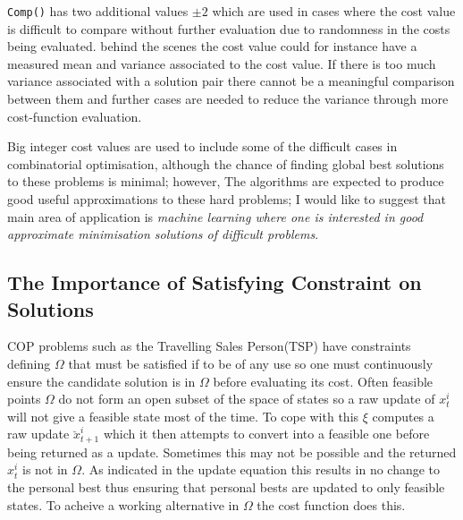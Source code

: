 \documentclass[a4paper,oneside,english]{book}
\numberwithin{equation}{section}
\numberwithin{figure}{section}
\begin{document}
\texttt{Comp()} has two additional values $\pm2$ which are used in cases where the cost value is difficult to compare without further evaluation due to randomness in the costs being evaluated. behind the scenes the cost value could for instance have a measured mean and variance associated to the cost value. If there is too much variance associated with a solution pair there cannot be a meaningful comparison between them and further cases are needed to reduce the variance through more cost-function evaluation.  

Big integer cost values are used to include some of the difficult cases in combinatorial optimisation, although the chance of finding global best solutions to these problems is minimal; however, The algorithms are expected to produce good useful approximations to these hard problems; I would like to suggest that main area of application is \emph{machine learning where one is interested in good approximate minimisation solutions of difficult problems}.


\subsection{The Importance of Satisfying Constraint on Solutions }
COP problems such as the Travelling Sales Person(TSP) have constraints defining $\varOmega$ that must be satisfied if to be of any use so one must continuously ensure the candidate solution is in $\varOmega$ before evaluating its cost. Often feasible points $\varOmega$ do not form an open subset of the space of states so a raw update of $x_t^i$ will not give a feasible state most of the time. To cope with this $\xi$ computes a raw update $\breve{x}_{t+1}^i$ which it then attempts to  convert into a feasible one before being returned as a update. Sometimes this may not be possible and the returned $x_t^i$ is not in $\varOmega$. As indicated in the update equation this results in no change to the personal best thus ensuring that personal bests are updated to only feasible states.   To acheive a working alternative  in $\varOmega$ the  cost function does this. 
\end{document}
